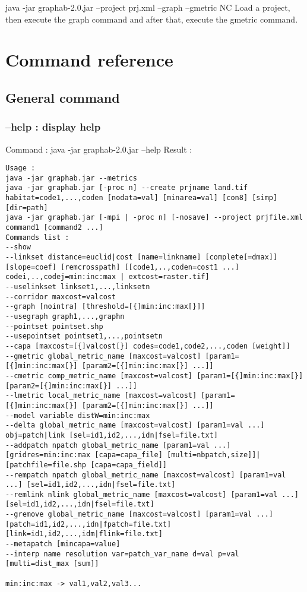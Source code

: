 \documentclass[a4paper,10pt]{report}
\newenvironment{cmd}
{\quote\Verbatim}
{\endVerbatim\endquote}
\begin{document}
\begin{cmd}
java -jar graphab-2.0.jar --project prj.xml --graph --gmetric NC  
\end{cmd}
Load a project, then execute the graph command and after that, execute the gmetric command.



\chapter{Command reference}
\section{General command}
\subsection{--help : display help}
Command :
\begin{cmd}
java -jar graphab-2.0.jar --help
\end{cmd}
Result :
\begin{verbatim}
Usage :
java -jar graphab.jar --metrics
java -jar graphab.jar [-proc n] --create prjname land.tif habitat=code1,...,coden [nodata=val] [minarea=val] [con8] [simp] [dir=path]
java -jar graphab.jar [-mpi | -proc n] [-nosave] --project prjfile.xml command1 [command2 ...]
Commands list :
--show
--linkset distance=euclid|cost [name=linkname] [complete[=dmax]] [slope=coef] [remcrosspath] [[code1,..,coden=cost1 ...] codei,..,codej=min:inc:max | extcost=raster.tif]
--uselinkset linkset1,...,linksetn
--corridor maxcost=valcost
--graph [nointra] [threshold=[{]min:inc:max[}]]
--usegraph graph1,...,graphn
--pointset pointset.shp
--usepointset pointset1,...,pointsetn
--capa [maxcost=[{]valcost[}] codes=code1,code2,...,coden [weight]]
--gmetric global_metric_name [maxcost=valcost] [param1=[{]min:inc:max[}] [param2=[{]min:inc:max[}] ...]]
--cmetric comp_metric_name [maxcost=valcost] [param1=[{]min:inc:max[}] [param2=[{]min:inc:max[}] ...]]
--lmetric local_metric_name [maxcost=valcost] [param1=[{]min:inc:max[}] [param2=[{]min:inc:max[}] ...]]
--model variable distW=min:inc:max
--delta global_metric_name [maxcost=valcost] [param1=val ...] obj=patch|link [sel=id1,id2,...,idn|fsel=file.txt]
--addpatch npatch global_metric_name [param1=val ...] [gridres=min:inc:max [capa=capa_file] [multi=nbpatch,size]]|[patchfile=file.shp [capa=capa_field]]
--rempatch npatch global_metric_name [maxcost=valcost] [param1=val ...] [sel=id1,id2,...,idn|fsel=file.txt]
--remlink nlink global_metric_name [maxcost=valcost] [param1=val ...] [sel=id1,id2,...,idn|fsel=file.txt]
--gremove global_metric_name [maxcost=valcost] [param1=val ...] [patch=id1,id2,...,idn|fpatch=file.txt] [link=id1,id2,...,idm|flink=file.txt]
--metapatch [mincapa=value]
--interp name resolution var=patch_var_name d=val p=val [multi=dist_max [sum]]

min:inc:max -> val1,val2,val3...
\end{verbatim}
\end{document}
